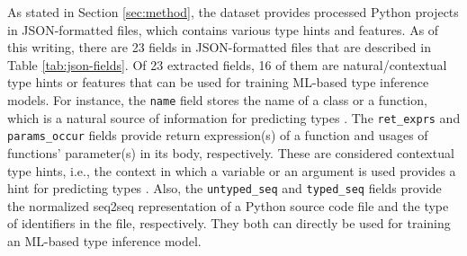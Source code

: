 \documentclass[10pt, conference]{IEEEtran}
\begin{document}
As stated in Section \ref{sec:method}, the dataset provides processed Python projects in JSON-formatted files, which contains various type hints and features. As of this writing, there are 23 fields in JSON-formatted files that are described in Table \ref{tab:json-fields}. Of 23 extracted fields, 16 of them are natural/contextual type hints or features that can be used for training ML-based type inference models. For instance, the \texttt{name} field stores the name of a class or a function, which is a natural source of information for predicting types \cite{malik2019nl2type}. The \texttt{ret\_exprs} and \texttt{params\_occur} fields provide return expression(s) of a function and usages of functions' parameter(s) in its body, respectively. These are considered contextual type hints, i.e., the context in which a variable or an argument is used provides a hint for predicting types \cite{pradel2019typewriter}. Also, the \texttt{untyped\_seq} and \texttt{typed\_seq} fields provide the normalized seq2seq representation of a Python source code file and the type of identifiers in the file, respectively. They both can directly be used for training an ML-based type inference model.
\end{document}
